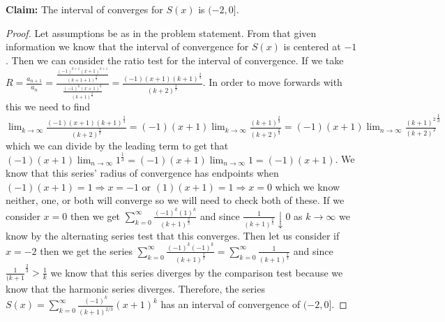 \documentclass[11pt]{article}
\theoremstyle{definition}
\begin{document}
\textbf{Claim:} The interval of converges for $S(x)$ is $(-2, 0]$.
\begin{proof}
Let assumptions be as in the problem statement. From that given information we know that the interval of convergence for $S(x)$ is centered at $-1$. Then we can consider the ratio test for the interval of convergence. If we take $R = \frac{a_{n+1}}{a_n} = \frac{\frac{(-1)^{k+1}(x+1)^{k+1}}{(k+1+1)^{\frac{2}{3}}}}{\frac{(-1)^k(x+1)^k}{(k+1)^{\frac{2}{3}}}} = \frac{(-1)(x+1)(k+1)^{\frac{2}{3}}}{(k+2)^{\frac{2}{3}}}$. In order to move forwards with this we need to find $\lim_{k\to \infty}\frac{(-1)(x+1)(k+1)^{\frac{2}{3}}}{(k+2)^{\frac{2}{3}}} = (-1)(x+1)\lim_{k\to \infty}\frac{(k+1)^{\frac{2}{3}}}{(k+2)^{\frac{2}{3}}} = (-1)(x+1)\lim_{n\to\infty}\frac{(k+1)^2}{(k+2)^2}^\frac{1}{3}$ which we can divide by the leading term to get that $(-1)(x+1)\lim_{n\to \infty}1^{\frac{1}{3}} = (-1)(x+1)\lim_{n\to \infty} 1 = (-1)(x+1)$. We know that this series' radius of convergence has endpoints when $(-1)(x+1) = 1 \Rightarrow x = -1$ or $(1)(x+1) = 1 \Rightarrow x = 0$ which we know neither, one, or both will converge so we will need to check both of these. If we consider $x = 0$ then we get $\sum_{k = 0}^\infty \frac{(-1)^k(1)^k}{(k+1)^{\frac{2}{3}}}$ and since $\frac{1}{(k+1)^\frac{2}{3}} \downarrow 0$ as $k \to \infty$ we know by the alternating series test that this converges. Then let us consider if $x = -2$ then we get the series $\sum_{k = 0}^\infty \frac{(-1)^k(-1)^k}{(k+1)^{\frac{2}{3}}} = \sum_{k = 0}^\infty \frac{1}{(k+1)^{\frac{2}{3}}}$ and since $\frac{1}{(k+1}^{\frac{2}{3}} > \frac{1}{k}$ we know that this series diverges by the comparison test because we know that the harmonic series diverges. Therefore, the series $S(x) = \sum_{k = 0}^\infty \frac{(-1)^k}{(k + 1)^{2/3}} (x+1)^k $ has an interval of convergence of $(-2, 0]$.
\end{proof}
\end{document}
